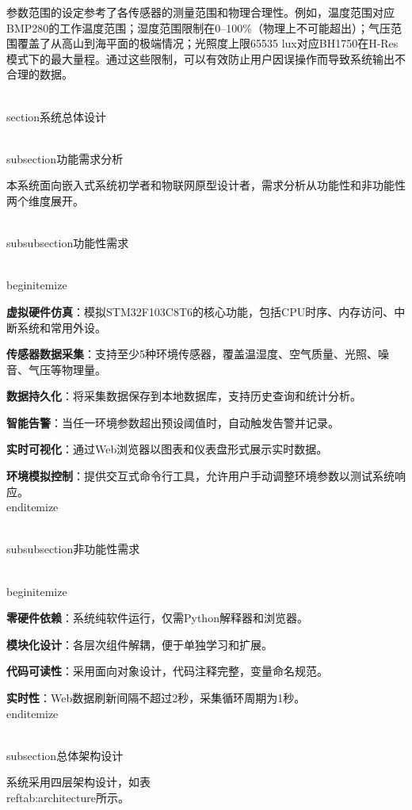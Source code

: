 \documentclass[12pt,a4paper]{ctexart}
\begin{document}
参数范围的设定参考了各传感器的测量范围和物理合理性。例如，温度范围对应BMP280的工作温度范围；湿度范围限制在0--100\%（物理上不可能超出）；气压范围覆盖了从高山到海平面的极端情况；光照度上限65535 lux对应BH1750在H-Res模式下的最大量程。通过这些限制，可以有效防止用户因误操作而导致系统输出不合理的数据。


\\section{系统总体设计}

\\subsection{功能需求分析}

本系统面向嵌入式系统初学者和物联网原型设计者，需求分析从功能性和非功能性两个维度展开。

\\subsubsection{功能性需求}

\\begin{itemize}
    \item \textbf{虚拟硬件仿真}：模拟STM32F103C8T6的核心功能，包括CPU时序、内存访问、中断系统和常用外设。
    \item \textbf{传感器数据采集}：支持至少5种环境传感器，覆盖温湿度、空气质量、光照、噪音、气压等物理量。
    \item \textbf{数据持久化}：将采集数据保存到本地数据库，支持历史查询和统计分析。
    \item \textbf{智能告警}：当任一环境参数超出预设阈值时，自动触发告警并记录。
    \item \textbf{实时可视化}：通过Web浏览器以图表和仪表盘形式展示实时数据。
    \item \textbf{环境模拟控制}：提供交互式命令行工具，允许用户手动调整环境参数以测试系统响应。
\\end{itemize}

\\subsubsection{非功能性需求}

\\begin{itemize}
    \item \textbf{零硬件依赖}：系统纯软件运行，仅需Python解释器和浏览器。
    \item \textbf{模块化设计}：各层次组件解耦，便于单独学习和扩展。
    \item \textbf{代码可读性}：采用面向对象设计，代码注释完整，变量命名规范。
    \item \textbf{实时性}：Web数据刷新间隔不超过2秒，采集循环周期为1秒。
\\end{itemize}

\\subsection{总体架构设计}

系统采用四层架构设计，如表~\\ref{tab:architecture}所示。
\end{document}
